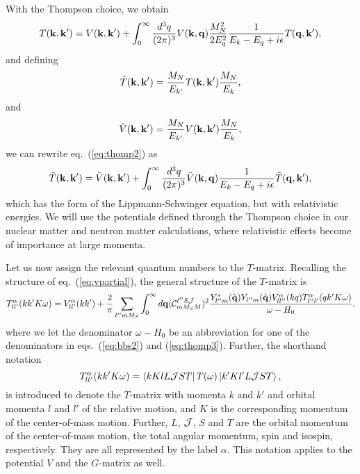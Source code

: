 With the Thompson choice, we obtain
\begin{equation}
   T({\bf k}, {\bf k}')=V({\bf k}, {\bf k}')
   +\int_{0}^{\infty} \frac{d^3 q}{(2\pi )^3}
     V({\bf k}, {\bf q})\frac{M_N^2}{2E_q^2}
     \frac{1}
     {E_k-E_q +i\epsilon}T({\bf q}, {\bf k}'),
\label{eq:thomp2}
\end{equation}
and defining
\begin{equation}
\tilde{T}({\bf k}, {\bf k}')=
\frac{M_N}{E_{k'}}T({\bf k}, {\bf k}')\frac{M_N}{E_{k}},
\end{equation}
and
\begin{equation}
\tilde{V}({\bf k}, {\bf k}')=
\frac{M_N}{E_{k'}}V({\bf k}, {\bf k}')\frac{M_N}{E_{k}},
\end{equation}
we can rewrite eq.\ (\ref{eq:thomp2}) as
\begin{equation}
  \tilde{ T}({\bf k}, {\bf k}')=\tilde{V}({\bf k}, {\bf k}')
   +\int_{0}^{\infty} \frac{d^3 q}{(2\pi )^3}
     \tilde{V}({\bf k}, {\bf q})
     \frac{1}
     {E_k-E_q +i\epsilon}\tilde{T}({\bf q}, {\bf k}'),
   \label{eq:thomp3}
\end{equation}
which has the form of the Lippmann-Schwinger equation, but with
relativistic energies. We will use the potentials defined through the
Thompson choice in our nuclear matter and neutron matter calculations, where
relativistic effects become of importance at large momenta.

Let us now assign the relevant quantum numbers to the $T$-matrix. Recalling
the structure of eq.\ (\ref{eq:vpartial}),
the general structure of the $T$-matrix is
\begin{equation}
   T_{ll'}^{\alpha}(kk'K\omega)=V_{ll'}^{\alpha}(kk')
   +{\displaystyle \frac{2}{\pi}\sum_{l''mM_S}\int_{0}^{\infty} d {\bf q}
   ({\cal C}_{mM_SM}^{l''S{\cal J}})^2
   \frac{Y_{l''m}^*(\hat{{\bf q}})
   Y_{l''m}(\hat{{\bf q}}) V_{ll''}^{\alpha}(kq)
   T_{l''l'}^{\alpha}(qk'K\omega)}
   {\omega -H_0}},
   \label{eq:bspartial}
\end{equation}
where we let the denominator $\omega -H_0$ be an abbreviation
for one of the denominators in
eqs.\ (\ref{eq:bbs2}) and (\ref{eq:thomp3}).
Further, the  shorthand notation
\begin{equation}
    T_{ll'}^{\alpha}(kk'K\omega)=
   \left\langle kKlL{\cal J}ST \right|T(\omega)\left| k'Kl'L{\cal J}ST \right\rangle,
\end{equation}
is introduced to denote the $T$-matrix
with momenta $k$ and $k'$ and orbital momenta $l$ and $l'$
of the relative motion, and
$K$ is the corresponding momentum of
the center-of-mass motion. Further, $L$, ${\cal J}$, $S$ and $T$
are the orbital momentum of the center-of-mass motion, the
total angular momentum,
spin and isospin, respectively. They are all represented by the
label $\alpha$. This notation applies to the potential $V$ and the
$G$-matrix as well.

